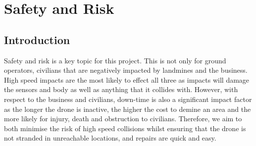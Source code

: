 \section{Safety and Risk}
\subsection{Introduction}
Safety and risk is a key topic for this project. This is not only for ground operators, civilians that are negatively impacted by landmines and the business. High speed impacts are the most likely to effect all three as impacts will damage the sensors and body as well as anything that it collides with. However, with respect to the business and civilians, down-time is also a significant impact factor as the longer the drone is inactive, the higher the cost to demine an area and the more likely for injury, death and obstruction to civilians. Therefore, we aim to both minimise the risk of high speed collisions whilst ensuring that the drone is not stranded in unreachable locations, and repairs are quick and easy.


